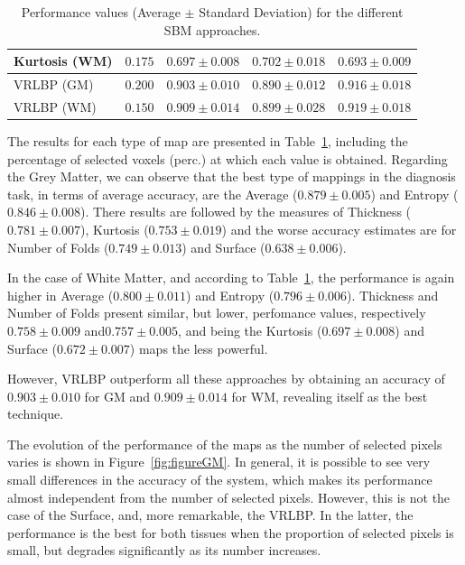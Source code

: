 \begin{table}[htp]
\begin{tabularx}{\textwidth}{Xcccc}
		Kurtosis (\ac{WM}) & $0.175$ & $0.697 \pm 0.008$ & $0.702 \pm 0.018$ & $0.693 \pm 0.009$ \\
		\midrule
		VRLBP (\ac{GM}) & $0.200$ & $0.903 \pm 0.010$ & $0.890 \pm 0.012$ & $0.916 \pm 0.018$ \\
		VRLBP (\ac{WM}) & $0.150$ & $0.909 \pm 0.014$ & $0.899 \pm 0.028$ & $0.919 \pm 0.018$ \\
		\bottomrule
	\end{tabularx}
	\caption{Performance values (Average $\pm$ Standard Deviation) for the different \ac{SBM} approaches.}
	\label{tab:perfProj}
\end{table}

The results for each type of map are presented in Table~\ref{tab:perfProj}, including the percentage of selected voxels (perc.) at which each value is obtained. Regarding the Grey Matter, we can observe that the best type of mappings in the diagnosis task, in terms of average accuracy, are the Average ($0.879 \pm 0.005$) and Entropy ($0.846 \pm 0.008$). There results are followed by the measures of Thickness ($0.781 \pm 0.007$), Kurtosis ($0.753 \pm 0.019$) and the worse accuracy estimates are for Number of Folds ($0.749 \pm 0.013$) and Surface ($0.638 \pm 0.006$). 

In the case of White Matter, and according to Table~\ref{tab:perfProj}, the performance is again higher in Average ($0.800 \pm 0.011$) and Entropy ($0.796 \pm 0.006$). Thickness and Number of Folds present similar, but lower, perfomance values, respectively $0.758 \pm 0.009$ and$0.757 \pm 0.005$, and being the Kurtosis ($0.697 \pm 0.008$) and Surface ($0.672 \pm 0.007$) maps the less powerful. 

However, VRLBP outperform all these approaches by obtaining an accuracy of $0.903 \pm 0.010$ for \ac{GM} and $0.909 \pm 0.014$ for \ac{WM}, revealing itself as the best technique. 

The evolution of the performance of the maps as the number of selected pixels varies is shown in Figure~\ref{fig:figureGM}. In general, it is possible to see very small differences in the accuracy of the system, which makes its performance almost independent from the number of selected pixels. However, this is not the case of the Surface, and, more remarkable, the VRLBP. In the latter, the performance is the best for both tissues when the proportion of selected pixels is small, but degrades significantly as its number increases. 

